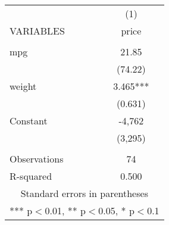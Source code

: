 \documentclass[]{article}
\begin{document}
\begin{tabular}{lc} \hline
 & (1) \\
VARIABLES & price \\ \hline
 &  \\
mpg & 21.85 \\
 & (74.22) \\
weight & 3.465*** \\
 & (0.631) \\
Constant & -4,762 \\
 & (3,295) \\
 &  \\
Observations & 74 \\
 R-squared & 0.500 \\ \hline
\multicolumn{2}{c}{ Standard errors in parentheses} \\
\multicolumn{2}{c}{ *** p$<$0.01, ** p$<$0.05, * p$<$0.1} \\
\end{tabular}
\end{document}
